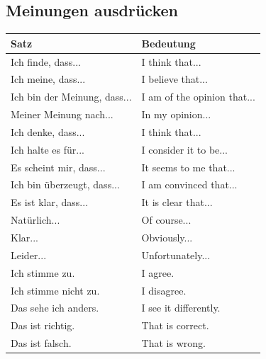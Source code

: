 \subsection{Meinungen ausdrücken}
\begin{center}
\begin{tabular}{|l|p{8cm}|}
\hline
\textbf{Satz} & \textbf{Bedeutung} \\ \hline
Ich finde, dass... & I think that... \\ \hline
Ich meine, dass... & I believe that... \\ \hline
Ich bin der Meinung, dass... & I am of the opinion that... \\ \hline
Meiner Meinung nach... & In my opinion... \\ \hline
Ich denke, dass... & I think that... \\ \hline
Ich halte es für... & I consider it to be... \\ \hline
Es scheint mir, dass... & It seems to me that... \\ \hline
Ich bin überzeugt, dass... & I am convinced that... \\ \hline
Es ist klar, dass... & It is clear that... \\ \hline
Natürlich... & Of course... \\ \hline
Klar... & Obviously... \\ \hline
Leider... & Unfortunately... \\ \hline
Ich stimme zu. & I agree. \\ \hline
Ich stimme nicht zu. & I disagree. \\ \hline
Das sehe ich anders. & I see it differently. \\ \hline
Das ist richtig. & That is correct. \\ \hline
Das ist falsch. & That is wrong. \\ \hline
\end{tabular}
\end{center}

